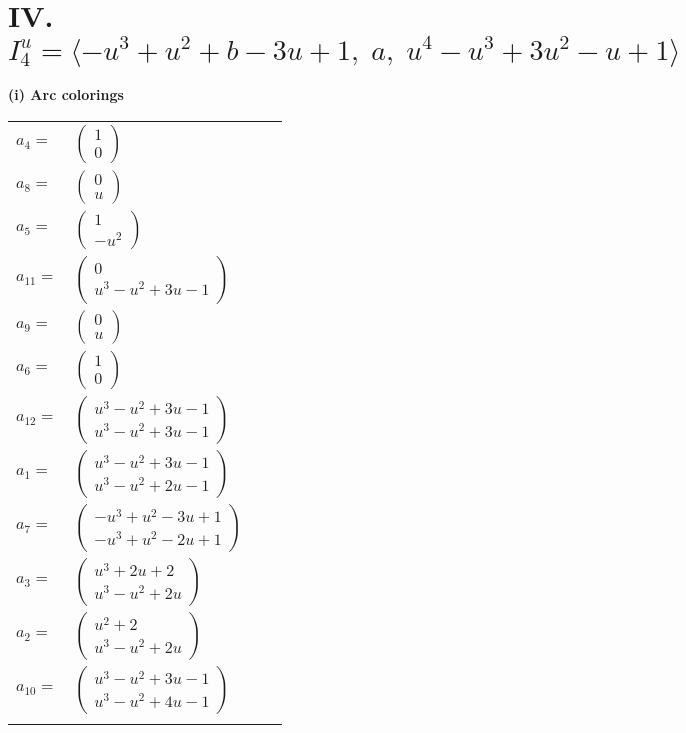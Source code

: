 \documentclass[1p]{elsarticle_modified}
\theoremstyle{definition}
\begin{document}
\centering \section*{IV. $I^u_{4}= \langle - u^3+u^2+b-3 u+1,\;a,\;u^4- u^3+3 u^2- u+1 \rangle$}
\flushleft \textbf{(i) Arc colorings}\\
\begin{tabular}{m{7pt} m{180pt} m{7pt} m{180pt} }
\flushright $a_{4}=$&$\begin{pmatrix}1\\0\end{pmatrix}$ \\
\flushright $a_{8}=$&$\begin{pmatrix}0\\u\end{pmatrix}$ \\
\flushright $a_{5}=$&$\begin{pmatrix}1\\- u^2\end{pmatrix}$ \\
\flushright $a_{11}=$&$\begin{pmatrix}0\\u^3- u^2+3 u-1\end{pmatrix}$ \\
\flushright $a_{9}=$&$\begin{pmatrix}0\\u\end{pmatrix}$ \\
\flushright $a_{6}=$&$\begin{pmatrix}1\\0\end{pmatrix}$ \\
\flushright $a_{12}=$&$\begin{pmatrix}u^3- u^2+3 u-1\\u^3- u^2+3 u-1\end{pmatrix}$ \\
\flushright $a_{1}=$&$\begin{pmatrix}u^3- u^2+3 u-1\\u^3- u^2+2 u-1\end{pmatrix}$ \\
\flushright $a_{7}=$&$\begin{pmatrix}- u^3+u^2-3 u+1\\- u^3+u^2-2 u+1\end{pmatrix}$ \\
\flushright $a_{3}=$&$\begin{pmatrix}u^3+2 u+2\\u^3- u^2+2 u\end{pmatrix}$ \\
\flushright $a_{2}=$&$\begin{pmatrix}u^2+2\\u^3- u^2+2 u\end{pmatrix}$ \\
\flushright $a_{10}=$&$\begin{pmatrix}u^3- u^2+3 u-1\\u^3- u^2+4 u-1\end{pmatrix}$\\&\end{tabular}
\end{document}
